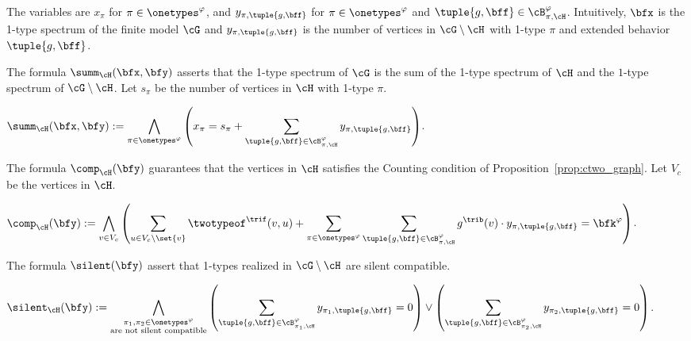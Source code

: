 \begin{compactitem}
    \item The variables are $x_\pi$ for $\pi \in \onetypes^\varphi$,
    and $y_{\pi, \tuple{g, \bff}}$ for $\pi \in \onetypes^\varphi$ and $\tuple{g, \bff} \in \cB^\varphi_{\pi, \cH}$.
    Intuitively, $\bfx$ is the 1-type spectrum of the finite model $\cG$ and $y_{\pi, \tuple{g, \bff}}$ is the number of vertices in $\cG \setminus \cH$ with 1-type $\pi$ and extended behavior $\tuple{g, \bff}$.
    \item
    The formula $\summ_{\cH}(\bfx, \bfy)$ asserts that the 1-type spectrum of $\cG$ is the sum of the 1-type spectrum of $\cH$ and
    the $1$-type spectrum of $\cG \setminus \cH$.
    Let $s_\pi$ be the number of vertices in $\cH$ with 1-type $\pi$. \\
    \begin{notsotiny}
    $\displaystyle\summ_{\cH}(\bfx, \bfy)
         := 
     \bigwedge_{\pi \in \onetypes^\varphi} \left(x_\pi = s_\pi + \sum_{\tuple{g, \bff} \in \cB^{\varphi}_{\pi, \cH}} y_{\pi, \tuple{g, \bff}}\right)$.
    \end{notsotiny}
    \item
    The formula $\comp_{\cH}(\bfy)$ guarantees that the vertices in $\cH$ satisfies the Counting condition of Proposition~\ref{prop:ctwo_graph}.
    Let $V_c$ be the vertices in $\cH$. \\
    \begin{notsotiny}
    $\displaystyle\comp_{\cH}(\bfy)
         := 
        \bigwedge_{v \in V_c} \left(
            \sum_{u \in V_c \setminus \set{v}} \twotypeof^\trif(v, u) +
            \sum_{\pi \in \onetypes^\varphi} \sum_{\tuple{g, \bff} \in \cB^{\varphi}_{\pi, \cH}} g^\trib(v) \cdot y_{\pi, \tuple{g, \bff}}
        = \bfk^\varphi \right)$.
        \end{notsotiny}
    \item
    The formula $\silent(\bfy)$ assert that 1-types realized in $\cG \setminus \cH$ are silent compatible. \\
    \begin{notsotiny}
    $\displaystyle\silent_{\cH}(\bfy)
         := 
        \bigwedge_{\substack{\pi_1, \pi_2 \in \onetypes^\varphi \\ \text{are not silent compatible}}}
        \left(\sum_{\tuple{g, \bff} \in \cB^{\varphi}_{\pi_1, \cH}} y_{\pi_1, \tuple{g, \bff}} = 0\right) \lor
        \left(\sum_{\tuple{g, \bff} \in \cB^{\varphi}_{\pi_2, \cH}} y_{\pi_2, \tuple{g, \bff}} = 0\right)$.
        \end{notsotiny}

\end{compactitem}
